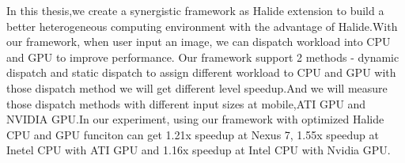 \begin{abstracten}
In this thesis,we create a synergistic framework as Halide extension to build a better heterogeneous computing environment with the advantage of Halide.With our framework, when user input an image, we can dispatch workload into CPU and GPU to improve performance. Our framework support 2 methods - dynamic dispatch and static dispatch to assign different workload to CPU and GPU with those dispatch method we will get different level speedup.And we will measure those dispatch methods with different input sizes at mobile,ATI GPU and NVIDIA GPU.In our experiment, using our framework with optimized Halide CPU and GPU funciton can get 1.21x speedup at Nexus 7, 1.55x speedup at Inetel CPU with ATI GPU and 1.16x speedup at Intel CPU with Nvidia GPU.
\cleardoublepage
\end{abstracten}
\cleardoublepage
